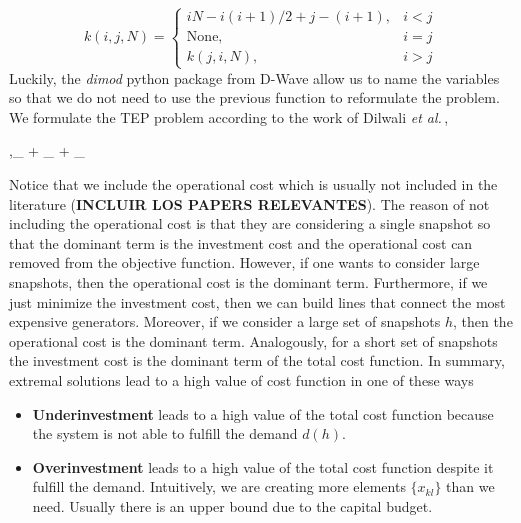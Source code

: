 \begin{equation}
k(i,j,N) = \begin{cases}
    iN - i\left(i+1\right)/2 + j - (i+1), & i<j\\
    \text{None},& i=j \\
    k(j,i,N), & i>j
\end{cases}
    \label{eq: TwoIndexesmap}
\end{equation}
Luckily, the \textit{dimod} python package from D-Wave allow us to name the variables so that we do not need to use the previous function to reformulate the problem. We formulate the TEP problem according to the work of Dilwali \textit{et al.}\,\cite{Dilwali2016},
\begin{mini!}[1]
	{,}{_{} + _{} + _{}}{\label{eq: objective}}{}{}
\end{mini!}
Notice that we include the operational cost which is usually not included in the literature (\textbf{INCLUIR LOS PAPERS RELEVANTES}). The reason of not including the operational cost is that they are considering a single snapshot so that the dominant term is the investment cost and the operational cost can removed from the objective function. However, if one wants to consider large snapshots, then the operational cost is the dominant term. Furthermore, if we just minimize the investment cost, then we can build lines that connect the most expensive generators. Moreover, if we consider a large set of snapshots $h$, then the operational cost is the dominant term. Analogously, for a short set of snapshots the investment cost is the dominant term of the total cost function. In summary, extremal solutions lead to a high value of cost function in one of these ways
\begin{itemize}
    \item \textbf{Underinvestment} leads to a high value of the total cost function because the system is not able to fulfill the demand $d(h)$.
    \item \textbf{Overinvestment} leads to a high value of the total cost function despite it fulfill the demand. Intuitively, we are creating more elements $\{x_{kl}\}$ than we need. Usually there is an upper bound due to the capital budget.
\end{itemize}
